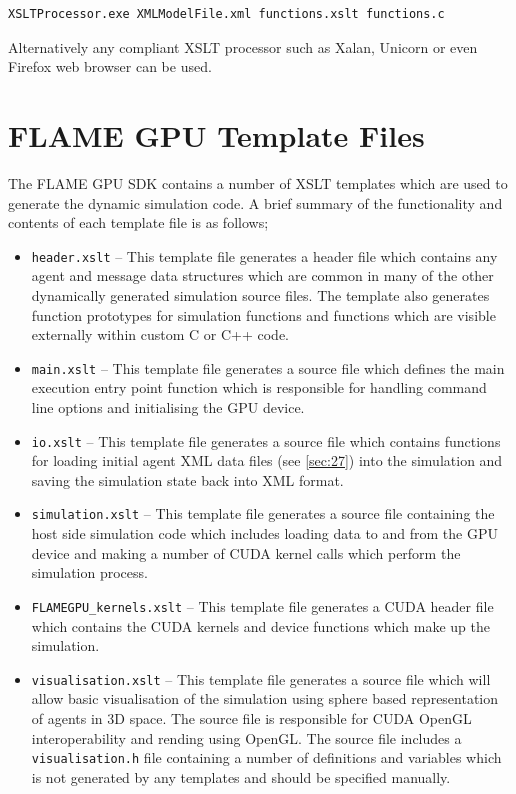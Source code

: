\documentclass[11pt, a4paper, onecolumn, oneside]{report}
\begin{document}
\begin{verbatim}
XSLTProcessor.exe XMLModelFile.xml functions.xslt functions.c
\end{verbatim}

Alternatively any compliant XSLT processor such as Xalan, Unicorn or even Firefox web browser can be used.

\section{FLAME GPU Template Files}
\label{sec:43}


The FLAME GPU SDK contains a number of XSLT templates which are used to generate the dynamic simulation code.
A brief summary of the functionality and contents of each template file is as follows; 

\begin{itemize}
    \item \texttt{header.xslt} -- This template file generates a header file which contains any agent and message data structures which are common in many of the other dynamically generated simulation source files.
        The template also generates function prototypes for simulation functions and functions which are visible externally within custom C or C++ code.
    \item \texttt{main.xslt} -- This template file generates a source file which defines the main execution entry point function which is responsible for handling command line options and initialising the GPU device.
    \item \texttt{io.xslt} -- This template file generates a source file which contains functions for loading initial agent XML data files (see \cref{sec:27}) into the simulation and saving the simulation state back into XML   format.
    \item \texttt{simulation.xslt} -- This template file generates a source file containing the host side simulation code which includes loading data to and from the GPU device and making a number of CUDA kernel calls which perform the simulation process.
    \item \texttt{FLAMEGPU\_kernels.xslt} -- This template file generates a CUDA header file which contains the CUDA kernels and device functions which make up the simulation.
    \item \texttt{visualisation.xslt} -- This template file generates a source file which will allow basic visualisation of the simulation using sphere based representation of agents in 3D space.
        The source file is responsible for CUDA OpenGL interoperability and rending using OpenGL.
        The source file includes a \texttt{visualisation.h} file containing a number of definitions and variables which is not generated by any templates and should be specified manually.
\end{itemize}
\end{document}
